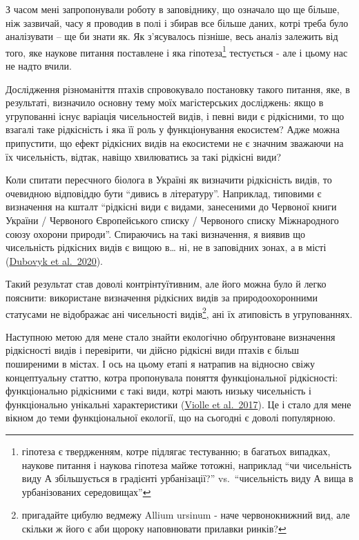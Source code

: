 \documentclass[
  11pt,
]{book}
\begin{document}
З часом мені запропонували роботу в заповіднику, що означало що ще більше, ніж зазвичай, часу я проводив в полі і збирав все більше даних, котрі треба було аналізувати -- ще би знати як. Як з'ясувалось пізніше, весь аналіз залежить від того, яке наукове питання поставлене і яка гіпотеза\footnote{гіпотеза є твердженням, котре підлягає тестуванню; в багатьох випадках, наукове питання і наукова гіпотеза майже тотожні, наприклад ``чи чисельність виду А збільшується в градієнті урбанізації?'' vs.~``чисельність виду А вища в урбанізованих середовищах''} тестується - але і цьому нас не надто вчили.

Дослідження різноманіття птахів спровокувало постановку такого питання, яке, в результаті, визначило основну тему моїх магістерських досліджень: якщо в угрупованні існує варіація чисельностей видів, і певні види є рідкісними, то що взагалі таке рідкісність і яка її роль у функціонування екосистем? Адже можна припустити, що ефект рідкісних видів на екосистеми не є значним зважаючи на їх чисельність, відтак, навіщо хвилюватись за такі рідкісні види?

Коли спитати пересчного біолога в Україні як визначити рідкісність видів, то очевидною відповіддю бути ``дивись в літературу''. Наприклад, типовими є визначення на кшталт ``рідкісні види є видами, занесеними до Червоної книги України / Червоного Європейського списку / Червоного списку Міжнародного союзу охорони природи''. Спираючись на такі визначення, я виявив що чисельність рідкісних видів є вищою в\ldots{} ні, не в заповідних зонах, а в місті (\href{http://doi.org/10.15407/gb1904}{Dubovyk et al.~2020}).

Такий результат став доволі контрінтуїтивним, але його можна було й легко пояснити: використане визначення рідкісних видів за природоохоронними статусами не відображає ані чисельності видів\footnote{пригадайте цибулю ведмежу Allium ursinum - наче червонокнижний вид, але скільки ж його є аби щороку наповнювати прилавки ринків?}, ані їх атиповість в угрупованнях.

Наступною метою для мене стало знайти екологічно обґрунтоване визначення рідкісності видів і перевірити, чи дійсно рідкісні види птахів є більш поширеними в містах. І ось на цьому етапі я натрапив на відносно свіжу концептуальну статтю, котра пропонувала поняття функціональної рідкісності: функціонально рідкісними є такі види, котрі мають низьку чисельність і функціонально унікальні характеристики (\href{https://doi.org/10.1016/j.tree.2017.02.002}{Violle et al.~2017}). Це і стало для мене вікном до теми функціональної екології, що на сьогодні є доволі популярною.
\end{document}
